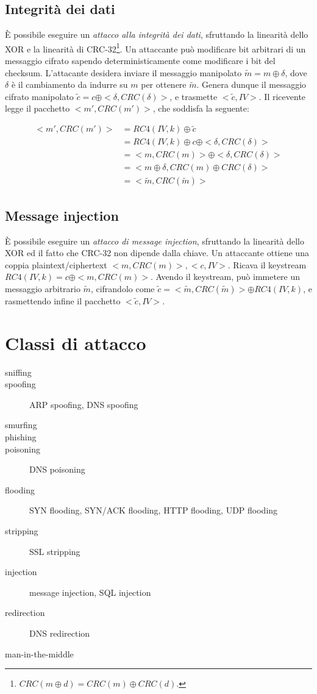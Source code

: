 \subsection{Integrità dei dati}
È possibile eseguire un \textit{attacco alla integrità dei dati}, sfruttando la linearità dello XOR e la linearità di CRC-32\footnote{$CRC(m \oplus d)=CRC(m) \oplus CRC(d)$.}.
Un attaccante può modificare bit arbitrari di un messaggio cifrato sapendo deterministicamente come modificare i bit del checksum.
L'attacante desidera inviare il messaggio manipolato $\tilde{m}=m \oplus \delta$, dove $\delta$ è il cambiamento da indurre su $m$ per ottenere $\tilde{m}$.
Genera dunque il messaggio cifrato manipolato $\tilde{c}=c \oplus <\delta,CRC(\delta)>$, e trasmette $<\tilde{c},IV>$.
Il ricevente legge il pacchetto $<m',CRC(m')>$, che soddisfa la seguente:

\begin{equation}
\begin{split}
<m',CRC(m')> & = RC4(IV,k) \oplus \tilde{c}\\
& = RC4(IV,k) \oplus c \oplus <\delta,CRC(\delta)>\\
& = <m,CRC(m)> \oplus <\delta,CRC(\delta)>\\
& = <m \oplus \delta,CRC(m) \oplus CRC(\delta)>\\
& = <\tilde{m},CRC(\tilde{m})>
\end{split}
\end{equation}


\subsection{Message injection}
È possibile eseguire un \textit{attacco di message injection}, sfruttando la linearità dello XOR ed il fatto che CRC-32 non dipende dalla chiave.
Un attaccante ottiene una coppia plaintext/ciphertext $<m,CRC(m)>,<c,IV>$.
Ricava il keystream $RC4(IV,k)=c \oplus <m,CRC(m)>$.
Avendo il keystream, può immetere un messaggio arbitrario $\tilde{m}$, cifrandolo come $\tilde{c}=<\tilde{m},CRC(\tilde{m})> \oplus RC4(IV,k)$, e rasmettendo infine il pacchetto $<\tilde{c},IV>$.

\section{Classi di attacco}

\begin{description}
  \item[sniffing]
  \item[spoofing] ARP spoofing, DNS spoofing
  \item[smurfing]
  \item[phishing]
  \item[poisoning] DNS poisoning
  \item[flooding] SYN flooding, SYN/ACK flooding, HTTP flooding, UDP flooding
  \item[stripping] SSL stripping
  \item[injection] message injection, SQL injection
  \item[redirection] DNS redirection
  \item[man-in-the-middle]
\end{description}

